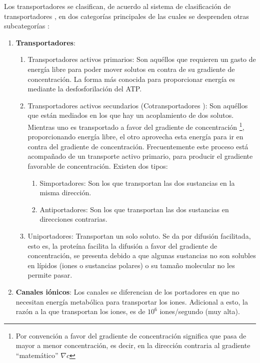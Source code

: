 Los transportadores se clasifican, de acuerdo al sistema de clasificaci\'{o}n de transportadores \cite{Nelson2011}, en dos categor\'{i}as principales de las cuales se desprenden otras subcategor\'{i}as :
\begin{enumerate}
 \item \textbf{Transportadores}:
 \begin{enumerate}
 \item[1.] Transportadores activos primarios: Son aqu\'{e}llos que requieren un gasto de energ\'{i}a libre para poder mover solutos en contra de su gradiente de concentraci\'{o}n. La forma m\'{a}s conocida para proporcionar energ\'{i}a es mediante la desfosforilaci\'{o}n del ATP.
 \item[2.a] Transportadores activos secundarios (Cotransportadores \cite{Nelson2011}): Son aqu\'{e}llos que est\'{a}n mediados en los que hay un acoplamiento de dos solutos. Mientras uno es transportado a favor del gradiente de concentraci\'{o}n \footnote{Por convenci\'{o}n a favor del gradiente de concentraci\'{o}n significa que pasa de mayor a menor concentraci\'{o}n, es decir, en la direcci\'{o}n contraria al gradiente ``matem\'{a}tico'' $\nabla c$}, proporcionando energ\'{i}a libre, el otro aprovecha esta energ\'{i}a para ir en contra del gradiente de concentraci\'{o}n. Frecuentemente este proceso est\'{a} acompa\~{n}ado de un transporte activo primario, para producir el gradiente favorable de concentraci\'{o}n. Existen dos tipos:
  \begin{enumerate}
 \item[a)] Simportadores: Son los que transportan las dos sustancias en la misma direcci\'{o}n.
 \item[b)] Antiportadores: Son los que transportan las dos sustancias en direcciones contrarias.
 \end{enumerate}
 \item[2.b] Uniportadores: Transportan un solo soluto. Se da por difusi\'{o}n facilitada, esto es, la prote\'{i}na facilita la difusi\'{o}n a favor del gradiente de concentraci\'{o}n, se presenta debido a que algunas sustancias no son solubles en l\'{i}pidos (iones o sustancias polares) o su tama\~{n}o molecular no les permite pasar.
 \end{enumerate}
 \item  \textbf{Canales i\'{o}nicos}: Los canales se diferencian de los portadores en que no necesitan energ\'{i}a metab\'{o}lica para transportar los iones. Adicional a esto, la raz\'{o}n a la que transportan los iones, es de $10^6$ iones/segundo  (muy alta).
 \end{enumerate}
